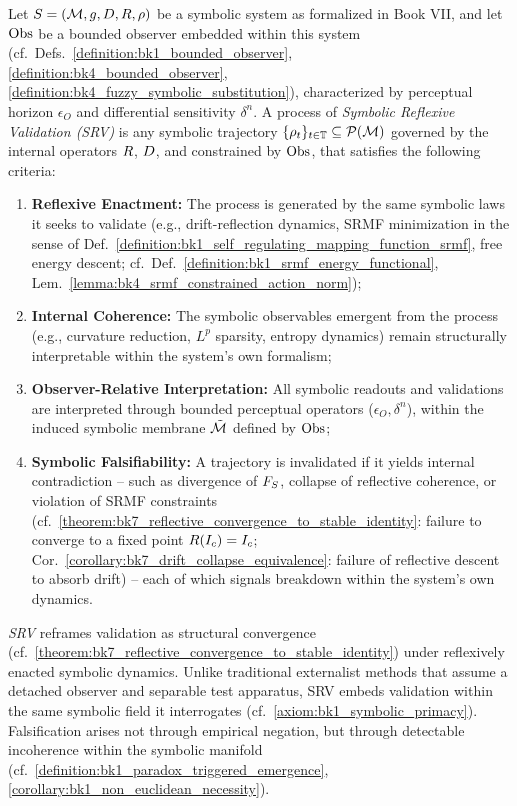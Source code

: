 \begin{definition}
\label{definition:bk7_symbolic_reflexive_validation_srv}
Let $S = (\mathcal{M}, g, D, R, \rho)$ be a symbolic system as formalized in Book VII, and let $\mathrm{Obs}$ be a bounded observer embedded within this system (cf.~Defs.~\ref{definition:bk1_bounded_observer}, \ref{definition:bk4_bounded_observer}, \ref{definition:bk4_fuzzy_symbolic_substitution}), characterized by perceptual horizon $\epsilon_O$ and differential sensitivity $\delta^n$. A process of \emph{Symbolic Reflexive Validation (SRV)} is any symbolic trajectory $\{\rho_t\}_{t \in \mathbb{T}} \subseteq \mathcal{P}(\mathcal{M})$ governed by the internal operators $R$, $D$, and constrained by $\mathrm{Obs}$, that satisfies the following criteria:
\begin{enumerate}[label=(\roman*)]
\item \textbf{Reflexive Enactment:} The process is generated by the same symbolic laws it seeks to validate (e.g., drift-reflection dynamics, SRMF minimization in the sense of Def.~\ref{definition:bk1_self_regulating_mapping_function_srmf}, free energy descent; cf.~Def.~\ref{definition:bk1_srmf_energy_functional}, Lem.~\ref{lemma:bk4_srmf_constrained_action_norm});
\item \textbf{Internal Coherence:} The symbolic observables emergent from the process (e.g., curvature reduction, $L^p$ sparsity, entropy dynamics) remain structurally interpretable within the system's own formalism;
\item \textbf{Observer-Relative Interpretation:} All symbolic readouts and validations are interpreted through bounded perceptual operators ($\epsilon_O, \delta^n$), within the induced symbolic membrane $\tilde{\mathcal{M}}$ defined by $\mathrm{Obs}$;
\item \textbf{Symbolic Falsifiability:}
A trajectory is invalidated if it yields internal contradiction --
such as divergence of \( F_S \), collapse of reflective coherence,
or violation of SRMF constraints (cf.~\ref{theorem:bk7_reflective_convergence_to_stable_identity}: failure to converge to a fixed point $R(I_c)=I_c$; Cor.~\ref{corollary:bk7_drift_collapse_equivalence}: failure of reflective descent to absorb drift) --
each of which signals breakdown within the system's own dynamics.
\end{enumerate}
\emph{SRV} reframes validation as structural convergence (cf.~\ref{theorem:bk7_reflective_convergence_to_stable_identity}) under reflexively enacted symbolic dynamics. Unlike traditional externalist methods that assume a detached observer and separable test apparatus, SRV embeds validation within the same symbolic field it interrogates (cf.~\ref{axiom:bk1_symbolic_primacy}). Falsification arises not through empirical negation, but through detectable incoherence within the symbolic manifold (cf.~\ref{definition:bk1_paradox_triggered_emergence}, \ref{corollary:bk1_non_euclidean_necessity}).


\end{definition}
